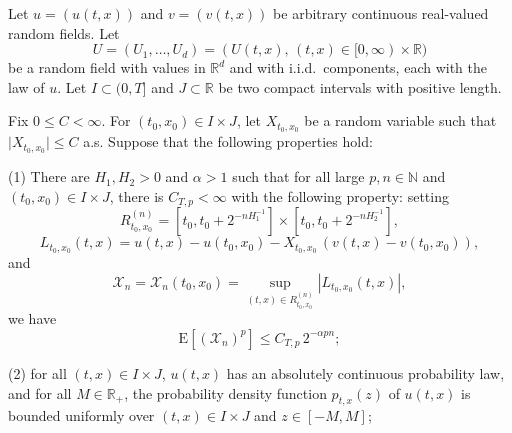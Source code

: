 \documentclass[12pt,a4paper]{article}
\newcommand{\N}{{\mathbb{N}}}
\newcommand{\R}{{\mathbb{R}}}
\newcommand{\E}{\mathrm{E}}
\newcommand{\XX}{\mathcal{X}}
\newcommand{\<}{\langle}
\renewcommand{\>}{\rangle}
\begin{document}
Let $u=(u(t, x))$ and $v=(v(t, x))$ be arbitrary continuous real-valued random fields. Let 
\[
   U =(U_1, \ldots, U_d) = (U(t, x),\, (t, x) \in [0, \infty) \times \R )
\] 
be a random field with values in $\R^d$ and with i.i.d.~components, each with the law of $u$. %
Let $I \subset (0, T]$ and $J \subset \mathbb{R}$ be two compact intervals with positive length.

\begin{theorem}\label{th2017-11-23-1}
Fix $0 \leq C < \infty$. For $(t_0, x_0) \in I \times J$,  let $X_{t_0, x_0}$ be a random variable such that  $\vert X_{t_0, x_0}\vert \leq C$ a.s. %
Suppose that the following properties hold:

   (1) There are $H_1, H_2 > 0$ and $\alpha > 1$ such that for all large $p, n \in \N$ and $(t_0, x_0) \in I \times J$, there is $C_{T, p} < \infty$ with the following property: setting 
\[
    R_{t_0, x_0}^{(n)} = \left[t_0, t_0 + 2^{-n H_1^{-1}}\right] \times \left[t_0, t_0 + 2^{-n H_2^{-1}}\right], 
\]
\begin{equation}\label{rd04_03e2}
   L_{t_0, x_0}(t, x) = u(t,x)-u(t_0,x_0) -X_{t_0, x_0}\, (v(t,x)-v(t_0,x_0)),
\end{equation}
and 
\begin{equation}\label{rd04_01e1}
    \XX_n = \XX_n(t_0, x_0) = \sup_{(t,x)\in R^{(n)}_{t_0,x_0}}  | L_{t_0, x_0}(t,x)|,
\end{equation}
 we have
\begin{equation}\label{rd04_01e2}
       \E\left[ (\XX_n)^p\right] \le C_{T,p}\,  2^{- \alpha p n} ;
\end{equation}
   
   (2) for all $(t, x) \in I \times J$,  $u(t, x)$ has an absolutely continuous probability law, and for all $M \in \R_+$, the probability density function $p_{t, x}(z)$ of $u(t, x)$ is bounded uniformly over $(t, x) \in I \times J$ and $z \in [-M, M]$;


\end{theorem}
\end{document}
